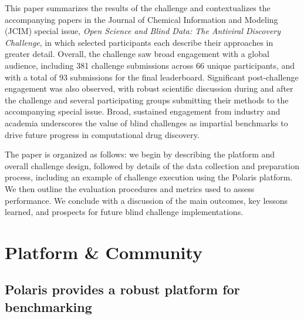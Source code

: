 \documentclass[journal=jcim,manuscript=article]{achemso}
\begin{document}
This paper summarizes the results of the challenge and contextualizes the accompanying papers in the Journal of Chemical Information and Modeling (JCIM) special issue, \textit{Open Science and Blind Data: The Antiviral Discovery Challenge}, in which selected participants each describe their approaches in greater detail. Overall, the challenge saw broad engagement with a global audience, including 381 challenge submissions across 66 unique participants, and with a total of 93 submissions for the final leaderboard. Significant post-challenge engagement was also observed, with robust scientific discussion during and after the challenge and several participating groups submitting their methods to the accompanying special issue. Broad, sustained engagement from industry and academia underscores the value of blind challenges as impartial benchmarks to drive future progress in computational drug discovery. 

The paper is organized as follows: we begin by describing the platform and overall challenge design, followed by details of the data collection and preparation process, including an example of challenge execution using the Polaris platform. We then outline the evaluation procedures and metrics used to assess performance. We conclude with a discussion of the main outcomes, key lessons learned, and prospects for future blind challenge implementations.

\section{Platform \& Community}

\subsection{Polaris provides a robust platform for benchmarking}
\end{document}
